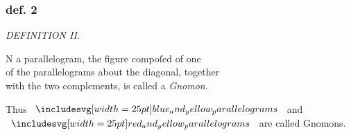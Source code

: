 \documentclass[12pt,preview]{standalone}
\begin{document}
\subsubsection{def. 2}

\begin{minipage}[t]{0.64\textwidth}
    \vspace{0pt}

    \begin{center}
        \textit{DEFINITION II.}\label{book2def2} \\
    \end{center}

    \hfill

    \begin{center}
        \raggedright \lettrine[lines=4, loversize=1, nindent=0pt]{}{}N a parallelogram, the figure compoſed of one\\ of the parallelograms about the diagonal, together\\ with the two complements, is called a \textit{Gnomon}.
    \end{center}

    \hfill

    \hfill

    \hfill

    \begin{center}
        Thus $\img{blue_and_yellow_parallelograms}$ and $\img{red_and_yellow_parallelograms}$ are called Gnomons.
    \end{center}
\end{minipage}%
\hfill
\begin{minipage}[t]{0.33\textwidth}
    \vspace{38pt}
    
\end{minipage}%
\end{document}
